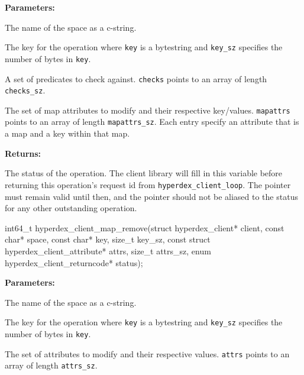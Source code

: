 \noindent\textbf{Parameters:}
\begin{description}[labelindent=\widthof{{\texttt{mapattrs}, \texttt{mapattrs\_sz}}},leftmargin=*,noitemsep,nolistsep,align=right]
\item[\texttt{space}] The name of the space as a c-string.
\item[\texttt{key}, \texttt{key\_sz}] The key for the operation where \texttt{key} is a bytestring and \texttt{key\_sz} specifies the number of bytes in \texttt{key}.
\item[\texttt{checks}, \texttt{checks\_sz}] A set of predicates to check against.  \texttt{checks} points to an array of length \texttt{checks\_sz}.
\item[\texttt{mapattrs}, \texttt{mapattrs\_sz}] The set of map attributes to modify and their respective key/values.  \texttt{mapattrs} points to an array of length \texttt{mapattrs\_sz}.  Each entry specify an attribute that is a map and a key within that map.
\end{description}

\noindent\textbf{Returns:}
\begin{description}[labelindent=\widthof{{\texttt{status}}},leftmargin=*,noitemsep,nolistsep,align=right]
\item[\texttt{status}] The status of the operation.  The client library will fill in this variable before returning this operation's request id from \texttt{hyperdex\_client\_loop}.  The pointer must remain valid until then, and the pointer should not be aliased to the status for any other outstanding operation.
\end{description}

\funcsep
{}
\begin{ccode}
int64_t hyperdex_client_map_remove(struct hyperdex_client* client,
                const char* space,
                const char* key, size_t key_sz,
                const struct hyperdex_client_attribute* attrs, size_t attrs_sz,
                enum hyperdex_client_returncode* status);
\end{ccode}
\funcdesc 

\noindent\textbf{Parameters:}
\begin{description}[labelindent=\widthof{{\texttt{attrs}, \texttt{attrs\_sz}}},leftmargin=*,noitemsep,nolistsep,align=right]
\item[\texttt{space}] The name of the space as a c-string.
\item[\texttt{key}, \texttt{key\_sz}] The key for the operation where \texttt{key} is a bytestring and \texttt{key\_sz} specifies the number of bytes in \texttt{key}.
\item[\texttt{attrs}, \texttt{attrs\_sz}] The set of attributes to modify and their respective values.  \texttt{attrs} points to an array of length \texttt{attrs\_sz}.
\end{description}

